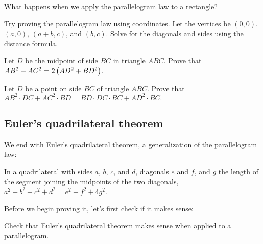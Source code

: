 \documentclass[11pt,paper=letter]{scrartcl}
\begin{document}
\begin{mdframed}[style=exmdbox]
  \begin{exercise}
    What happens when we apply the parallelogram law to a rectangle?
  \end{exercise}

  \begin{exercise}
    Try proving the parallelogram law using coordinates. Let the vertices be $(0, 0)$, $(a, 0)$, $(a + b, c)$, and $(b, c)$. Solve for the diagonals and sides using the distance formula.
  \end{exercise}

  \begin{problem}
    Let $D$ be the midpoint of side $BC$ in triangle $ABC$. Prove that $AB^2 + AC^2 = 2\left( AD^2 + BD^2 \right)$. \hint{\ref{h:pl31}}
  \end{problem}

  \begin{problem}
    Let $D$ be a point on side $BC$ of triangle $ABC$. Prove that $AB^2 \cdot DC + AC^2 \cdot BD = BD \cdot DC \cdot BC + AD^2 \cdot BC.$ \hint{\ref{h:pl41}}
  \end{problem}
\end{mdframed}

\subsection{Euler's quadrilateral theorem}

We end with Euler's quadrilateral theorem, a generalization of the parallelogram law:

\begin{thmboxed}
  In a quadrilateral with sides $a$, $b$, $c$, and $d$, diagonals $e$ and $f$, and $g$ the length of the segment joining the midpoints of the two diagonals, $a^2 + b^2 + c^2 + d^2 = e^2 + f^2 + 4g^2$.
\end{thmboxed}

\newpage

Before we begin proving it, let's first check if it makes sense:

\begin{exboxed}
  Check that Euler's quadrilateral theorem makes sense when applied to a parallelogram.
\end{exboxed}
\end{document}
